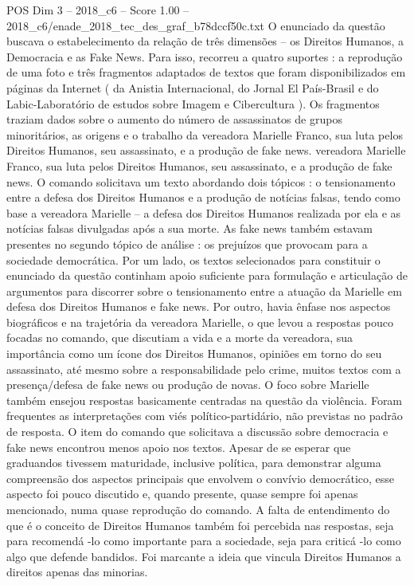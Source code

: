 \begin{textsample}{POS Dim 3 – 2018\_c6 – Score 1.00 – 2018\_c6/enade\_2018\_tec\_des\_graf\_b78dccf50c.txt}
O enunciado da questão buscava o estabelecimento da relação de três dimensões – os Direitos Humanos, a Democracia e as Fake News.
Para isso, recorreu a quatro suportes : a reprodução de uma foto e três fragmentos adaptados de textos que foram disponibilizados em páginas da Internet ( da Anistia Internacional, do Jornal El País-Brasil e do Labic-Laboratório de estudos sobre Imagem e Cibercultura ).
Os fragmentos traziam dados sobre o aumento do número de assassinatos de grupos minoritários, as origens e o trabalho da vereadora Marielle Franco, sua luta pelos Direitos Humanos, seu assassinato, e a produção de fake news. vereadora Marielle Franco, sua luta pelos Direitos Humanos, seu assassinato, e a produção de fake news.
O comando solicitava um texto abordando dois tópicos : o tensionamento entre a defesa dos Direitos Humanos e a produção de notícias falsas, tendo como base a vereadora Marielle – a defesa dos Direitos Humanos realizada por ela e as notícias falsas divulgadas após a sua morte.
As fake news também estavam presentes no segundo tópico de análise : os prejuízos que provocam para a sociedade democrática.
Por um lado, os textos selecionados para constituir o enunciado da questão continham apoio suficiente para formulação e articulação de argumentos para discorrer sobre o tensionamento entre a atuação da Marielle em defesa dos Direitos Humanos e fake news.
Por outro, havia ênfase nos aspectos biográficos e na trajetória da vereadora Marielle, o que levou a respostas pouco focadas no comando, que discutiam a vida e a morte da vereadora, sua importância como um ícone dos Direitos Humanos, opiniões em torno do seu assassinato, até mesmo sobre a responsabilidade pelo crime, muitos textos com a presença/defesa de fake news ou produção de novas.
O foco sobre Marielle também ensejou respostas basicamente centradas na questão da violência.
Foram frequentes as interpretações com viés político-partidário, não previstas no padrão de resposta.
O item do comando que solicitava a discussão sobre democracia e fake news encontrou menos apoio nos textos.
Apesar de se esperar que graduandos tivessem maturidade, inclusive política, para demonstrar alguma compreensão dos aspectos principais que envolvem o convívio democrático, esse aspecto foi pouco discutido e, quando presente, quase sempre foi apenas mencionado, numa quase reprodução do comando.
A falta de entendimento do que é o conceito de Direitos Humanos também foi percebida nas respostas, seja para recomendá -lo como importante para a sociedade, seja para criticá -lo como algo que defende bandidos.
Foi marcante a ideia que vincula Direitos Humanos a direitos apenas das minorias.

\end{textsample}
